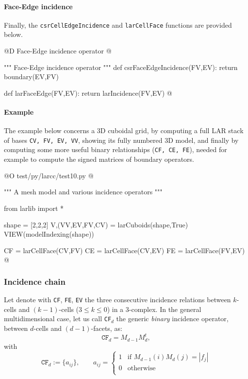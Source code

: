 \documentclass[11pt,oneside]{article}    %
\begin{document}
\paragraph{Face-Edge incidence}
Finally, the \texttt{csrCellEdgeIncidence} and \texttt{larCellFace} functions are provided below.

@D Face-Edge incidence operator
@{""" Face-Edge incidence operator """
def csrFaceEdgeIncidence(FV,EV):
    return boundary(EV,FV)

def larFaceEdge(FV,EV):
    return larIncidence(FV,EV)
@}


\paragraph{Example}
The example below concerns a 3D cuboidal grid, by computing a full LAR stack of bases
\texttt{CV, FV, EV, VV}, showing its fully numbered 3D model, and finally by computing
some more useful binary relationships (\texttt{CF, CE, FE}), needed for example to compute the signed matrices of boundary operators.

@O test/py/larcc/test10.py
@{""" A mesh model and various incidence operators """

from larlib import *

shape = [2,2,2]
V,(VV,EV,FV,CV) = larCuboids(shape,True)
VIEW(modelIndexing(shape))

CF = larCellFace(CV,FV)
CE = larCellFace(CV,EV)
FE = larCellFace(FV,EV)
@}

\subsubsection{Incidence chain}

Let denote with \texttt{CF}, \texttt{FE}, \texttt{EV} the three consecutive incidence relations between $k$-cells and $(k-1)$-cells ($3\leq k\leq 0$) in a 3-complex. In the general multidimensional case, let us call \texttt{CF}$_d$  the generic \emph{binary} incidence operator, between $d$-cells and $(d-1)$-facets, as:
\[
\texttt{CF}_d = M_{d-1} M_d^t, 
\]
with
\[
\texttt{CF}_d := \{a_{ij}\}, \qquad a_{ij} = 
\left\{
\begin{array}{cl}
1 & \mbox{if\ } M_{d-1}(i) M_d(j) = |f_j|  \\
0 & \mbox{otherwise}  \\  
\end{array}
\right.
\]
\end{document}
